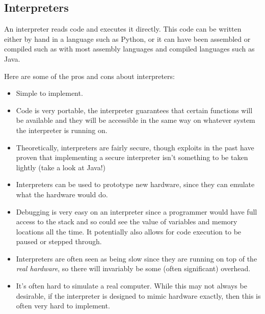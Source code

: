 
\subsection{Interpreters}

An interpreter reads code and executes it directly. This code can be written
either by hand in a language such as Python, or it can have been assembled or
compiled such as with most assembly languages and compiled languages such as
Java.

Here are some of the pros and cons about interpreters:

\begin{itemize}
	\item Simple to implement.
	
	\item Code is very portable, the interpreter guarantees that certain
	functions will be available and they will be accessible in the same way
	on whatever system the interpreter is running on.

	\item Theoretically, interpreters are fairly secure, though exploits in the
	past have proven that implementing a secure interpreter isn't something to
	be taken lightly (take a look at Java!)

	\item Interpreters can be used to prototype new hardware, since they can
	emulate what the hardware would do.

	\item Debugging is very easy on an interpreter since a programmer would have
	full access to the stack and so could see the value of variables and memory
	locations all the time. It potentially also allows for code execution to be
	paused or stepped through.

	\item Interpreters are often seen as being slow since they are running on
	top of the {\it real hardware}, so there will invariably be some (often
	significant) overhead.

	\item It's often hard to simulate a real computer. While this may not always
	be desirable, if the interpreter is designed to mimic hardware exactly,
	then this is often very hard to implement.
\end{itemize}

